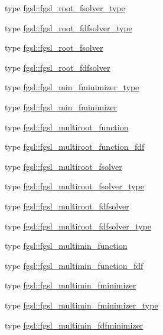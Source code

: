 \begin{DoxyCompactItemize}
\item 
type \hyperlink{structfgsl_1_1fgsl__root__fsolver__type}{fgsl\+::fgsl\+\_\+root\+\_\+fsolver\+\_\+type}
\item 
type \hyperlink{structfgsl_1_1fgsl__root__fdfsolver__type}{fgsl\+::fgsl\+\_\+root\+\_\+fdfsolver\+\_\+type}
\item 
type \hyperlink{structfgsl_1_1fgsl__root__fsolver}{fgsl\+::fgsl\+\_\+root\+\_\+fsolver}
\item 
type \hyperlink{structfgsl_1_1fgsl__root__fdfsolver}{fgsl\+::fgsl\+\_\+root\+\_\+fdfsolver}
\item 
type \hyperlink{structfgsl_1_1fgsl__min__fminimizer__type}{fgsl\+::fgsl\+\_\+min\+\_\+fminimizer\+\_\+type}
\item 
type \hyperlink{structfgsl_1_1fgsl__min__fminimizer}{fgsl\+::fgsl\+\_\+min\+\_\+fminimizer}
\item 
type \hyperlink{structfgsl_1_1fgsl__multiroot__function}{fgsl\+::fgsl\+\_\+multiroot\+\_\+function}
\item 
type \hyperlink{structfgsl_1_1fgsl__multiroot__function__fdf}{fgsl\+::fgsl\+\_\+multiroot\+\_\+function\+\_\+fdf}
\item 
type \hyperlink{structfgsl_1_1fgsl__multiroot__fsolver}{fgsl\+::fgsl\+\_\+multiroot\+\_\+fsolver}
\item 
type \hyperlink{structfgsl_1_1fgsl__multiroot__fsolver__type}{fgsl\+::fgsl\+\_\+multiroot\+\_\+fsolver\+\_\+type}
\item 
type \hyperlink{structfgsl_1_1fgsl__multiroot__fdfsolver}{fgsl\+::fgsl\+\_\+multiroot\+\_\+fdfsolver}
\item 
type \hyperlink{structfgsl_1_1fgsl__multiroot__fdfsolver__type}{fgsl\+::fgsl\+\_\+multiroot\+\_\+fdfsolver\+\_\+type}
\item 
type \hyperlink{structfgsl_1_1fgsl__multimin__function}{fgsl\+::fgsl\+\_\+multimin\+\_\+function}
\item 
type \hyperlink{structfgsl_1_1fgsl__multimin__function__fdf}{fgsl\+::fgsl\+\_\+multimin\+\_\+function\+\_\+fdf}
\item 
type \hyperlink{structfgsl_1_1fgsl__multimin__fminimizer}{fgsl\+::fgsl\+\_\+multimin\+\_\+fminimizer}
\item 
type \hyperlink{structfgsl_1_1fgsl__multimin__fminimizer__type}{fgsl\+::fgsl\+\_\+multimin\+\_\+fminimizer\+\_\+type}
\item 
type \hyperlink{structfgsl_1_1fgsl__multimin__fdfminimizer}{fgsl\+::fgsl\+\_\+multimin\+\_\+fdfminimizer}
\item 

\end{DoxyCompactItemize}
